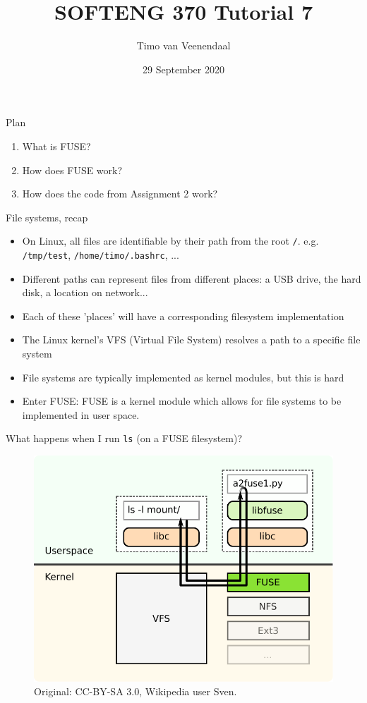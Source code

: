 \documentclass[notes]{beamer}
\title{SOFTENG 370 Tutorial 7}
\author{Timo van Veenendaal}
\date{29 September 2020}
\begin{document}
\maketitle

\begin{frame}{Plan}
    \begin{enumerate}
        \item What is FUSE?
        \item How does FUSE work?
        \item How does the code from Assignment 2 work?
    \end{enumerate}
\end{frame}
\begin{frame}{File systems, recap}
    \begin{itemize}
        \item On Linux, all files are identifiable by their path from the root \texttt{/}. e.g. \texttt{/tmp/test}, \texttt{/home/timo/.bashrc}, ...
        \item Different paths can represent files from different places: a USB drive, the hard disk, a location on network...
        \item Each of these 'places' will have a corresponding filesystem implementation
        \item The Linux kernel's VFS (Virtual File System) resolves a path to a specific file system
        \item File systems are typically implemented as kernel modules, but this is hard
        \item Enter FUSE: FUSE is a kernel module which allows for file systems to be implemented in user space.
    \end{itemize}
\end{frame}
\begin{frame}{What happens when I run \texttt{ls} (on a FUSE filesystem)?}
    \begin{figure}
        \centering
        \includegraphics[width=.75\textwidth]{FUSE_structure.pdf}
        \caption{Original: CC-BY-SA 3.0, Wikipedia user Sven.}
    \end{figure}
\end{frame}
\end{document}
